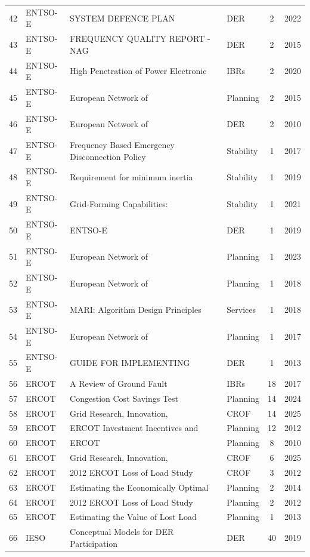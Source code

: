 {\begin{longtable}{c l p{5.5cm} l c c}
42 & ENTSO-E & SYSTEM DEFENCE PLAN & DER & 2 & 2022 \\
43 & ENTSO-E & FREQUENCY QUALITY REPORT - NAG & DER & 2 & 2015 \\
44 & ENTSO-E & High Penetration of Power Electronic & IBRs & 2 & 2020 \\
45 & ENTSO-E & European Network of & Planning & 2 & 2015 \\
46 & ENTSO-E & European Network of & DER & 2 & 2010 \\
47 & ENTSO-E & Frequency Based Emergency Disconnection Policy & Stability & 1 & 2017 \\
48 & ENTSO-E & Requirement for minimum inertia & Stability & 1 & 2019 \\
49 & ENTSO-E & Grid-Forming Capabilities: & Stability & 1 & 2021 \\
50 & ENTSO-E & ENTSO-E & DER & 1 & 2019 \\
51 & ENTSO-E & European Network of & Planning & 1 & 2023 \\
52 & ENTSO-E & European Network of & Planning & 1 & 2018 \\
53 & ENTSO-E & MARI: Algorithm Design Principles & Services & 1 & 2018 \\
54 & ENTSO-E & European Network of & Planning & 1 & 2017 \\
55 & ENTSO-E & GUIDE FOR IMPLEMENTING & DER & 1 & 2013 \\
56 & ERCOT & A Review of Ground Fault & IBRs & 18 & 2017 \\
57 & ERCOT & Congestion Cost Savings Test & Planning & 14 & 2024 \\
58 & ERCOT & Grid Research, Innovation, & CROF & 14 & 2025 \\
59 & ERCOT & ERCOT Investment Incentives and & Planning & 12 & 2012 \\
60 & ERCOT & ERCOT & Planning & 8 & 2010 \\
61 & ERCOT & Grid Research, Innovation, & CROF & 6 & 2025 \\
62 & ERCOT & 2012 ERCOT Loss of Load Study & CROF & 3 & 2012 \\
63 & ERCOT & Estimating the Economically Optimal & Planning & 2 & 2014 \\
64 & ERCOT & 2012 ERCOT Loss of Load Study & Planning & 2 & 2012 \\
65 & ERCOT & Estimating the Value of Lost Load & Planning & 1 & 2013 \\
66 & IESO & Conceptual Models for DER Participation & DER & 40 & 2019 \\

\end{longtable}}
